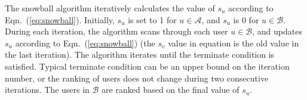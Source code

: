 \documentclass{article}
\begin{document}



The snowball algorithm iteratively calculates the value of $s_u$ according to Eqn.~(\ref{eq:snowball}). Initially, $s_u$ is set to 1 for $u \in \mathcal{A}$, and $s_u$ is 0 for $u \in \mathcal{B}$. During each iteration, the algorithm scans through each user $u \in \mathcal{B}$, and updates $s_u$ according to Eqn.~(\ref{eq:snowball}) (the $s_v$ value in equation is the old value in the last iteration). The algorithm iterates until the terminate condition is satisfied. Typical terminate condition can be an upper bound on the iteration number, or the ranking of users does not change during two consecutive iterations. The users in $\mathcal{B}$ are ranked based on the final value of $s_u$.
\end{document}
